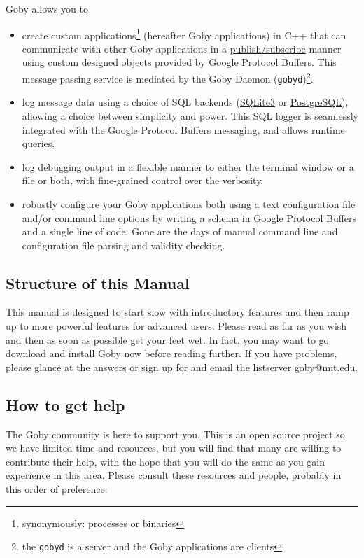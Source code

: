 \documentclass[11pt, letterpaper]{article}
\begin{document}
Goby allows you to
\begin{itemize}
\item create custom applications\footnote{synonymously: processes or binaries} (hereafter Goby applications) in C++ that can communicate with other Goby applications in a \href{http://en.wikipedia.org/wiki/Publish/subscribe}{publish/subscribe} manner using custom designed objects provided by \href{http://code.google.com/apis/protocolbuffers/}{Google Protocol Buffers}. This message passing service is mediated by the Goby Daemon (\texttt{gobyd})\footnote{the \texttt{gobyd} is a server and the Goby applications are clients}.
\item log message data using a choice of SQL backends (\href{http://www.sqlite.org/}{SQLite3} or \href{http://www.postgresql.org/}{PostgreSQL}), allowing a choice between simplicity and power. This SQL logger is seamlessly integrated with the Google Protocol Buffers messaging, and allows runtime queries.
\item log debugging output in a flexible manner to either the terminal window or a file or both, with fine-grained control over the verbosity.
\item robustly configure your Goby applications both using a text configuration file and/or command line options by writing a schema in Google Protocol Buffers and a single line of code. Gone are the days of manual command line and configuration file parsing and validity checking.
\end{itemize}

\subsection{Structure of this Manual}
This manual is designed to start slow with introductory features and then ramp up to more powerful features for advanced users. Please read as far as you wish and then as soon as possible get your feet wet. In fact, you may want to go \href{http://gobysoft.com/doc}{download and install} Goby now before reading further. If you have problems, please glance at the \href{https://answers.launchpad.net/goby}{answers} or \href{http://mailman.mit.edu/mailman/listinfo/goby}{sign up for} and email the listserver \href{mailto:goby@mit.edu}{goby@mit.edu}.

\subsection{How to get help}
The Goby community is here to support you. This is an open source project so we have limited time and resources, but you will find that many are willing to contribute their help, with the hope that you will do the same as you gain experience in this area. Please consult these resources and people, probably in this order of preference:
\end{document}
